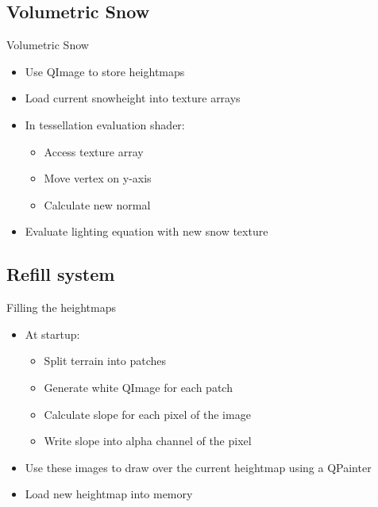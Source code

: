 \documentclass[18pt]{beamer}
\begin{document}
\subsection{Volumetric Snow}
\begin{frame}{Volumetric Snow}
\begin{itemize}
\item Use QImage to store heightmaps
\item Load current snowheight into texture arrays
\item In tessellation evaluation shader:
\begin{itemize}
	\item Access texture array
	\item Move vertex on y-axis
	\item Calculate new normal
\end{itemize}
\item Evaluate lighting equation with new snow texture
\end{itemize}
\end{frame}

\subsection{Refill system}
\begin{frame}{Filling the heightmaps}
\begin{itemize}
\item At startup:
\begin{itemize}
	\item Split terrain into patches
	\item Generate white QImage for each patch
	\item Calculate slope for each pixel of the image
	\item Write slope into alpha channel of the pixel
\end{itemize}
\item Use these images to draw over the current heightmap using a QPainter
\item Load new heightmap into memory
\end{itemize}
\end{frame}
\end{document}
